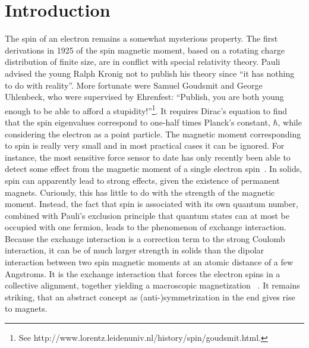 \documentclass[12pt,aps,nofootinbib]{revtex4-1}
\begin{document}
\section{Introduction}
\label{Introduction} The spin of an electron remains a somewhat
mysterious property. The first derivations in 1925 of the spin
magnetic moment, based on a rotating charge distribution of finite
size, are in conflict with special relativity theory. Pauli
advised the young Ralph Kronig not to publish his theory since
``it has nothing to do with reality''. More fortunate were Samuel
Goudsmit and George Uhlenbeck, who were supervised by Ehrenfest:
``Publish, you are both young enough to be able to afford a
stupidity!''\footnote{See http://www.lorentz.leidenuniv.nl/history/spin/goudsmit.html.}. It requires Dirac's equation to
find that the spin eigenvalues correspond to one-half times
Planck's constant, $\hbar$, while considering the electron as a
point particle. The magnetic moment corresponding to spin is
really very small and in most practical cases it can be ignored.
For instance, the most sensitive force sensor to date has only
recently been able to detect some effect from the magnetic moment
of a single electron spin~\cite{rugar04}. In solids, spin can
apparently lead to strong effects, given the existence of
permanent magnets. Curiously, this has little to do with the
strength of the magnetic moment. Instead, the fact that spin is
associated with its own quantum number, combined with Pauli's
exclusion principle that quantum states can at most be occupied
with one fermion, leads to the phenomenon of exchange interaction.
Because the exchange interaction is a correction term to the
strong Coulomb interaction, it can be of much larger strength in
solids than the dipolar interaction between two spin magnetic
moments at an atomic distance of a few Angstroms. It is the
exchange interaction that forces the electron spins in a
collective alignment, together yielding a macroscopic
magnetization ~\cite{ashcroft}. It remains striking, that an abstract concept as
(anti-)symmetrization in the end gives rise to magnets.
\end{document}
